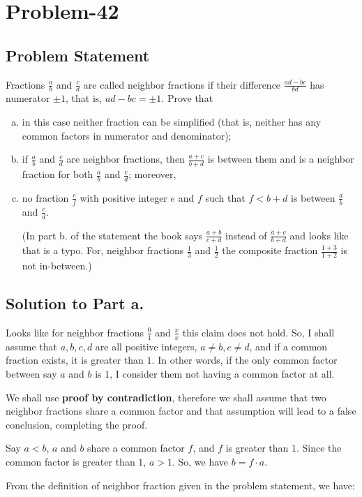 \documentclass{article}
\begin{document}
\section*{Problem-42}

\subsection*{Problem Statement}
Fractions $\frac{a}{b}$ and $\frac{c}{d}$ are called neighbor fractions if their difference $\frac{ad-bc}{bd}$ has numerator $\pm 1$, that is, $ad-bc = \pm 1$. Prove that 
\begin{enumerate}[a.]
\item in this case neither fraction can be simplified (that is, neither has any common factors in numerator and denominator);
\item if $\frac{a}{b}$ and $\frac{c}{d}$ are neighbor fractions, then $\frac{a+c}{b+d}$ is between them and is a neighbor fraction for both $\frac{a}{b}$ and $\frac{c}{d}$; moreover,
\item no fraction $\frac{e}{f}$ with positive integer $e$ and $f$ such that $f < b+d$ is between $\frac{a}{b}$ and $\frac{c}{d}$.

(In part b. of the statement the book says $\frac{a+b}{c+d}$ instead of $\frac{a+c}{b+d}$ and looks like that is a typo. For, neighbor fractions $\frac{1}{3}$ and $\frac{1}{2}$ the composite fraction $\frac{1+3}{1+2}$ is not in-between.)
\end{enumerate}
\subsection*{Solution to Part a.}
Looks like for neighbor fractions $\frac{0}{1}$ and $\frac{x}{x}$ this claim does not hold. So, I shall assume that $a, b, c, d$ are all positive integers, $a \neq b, c \neq d$, and if a common fraction exists, it is greater than $1$. In other words, if the only common factor between say $a$ and $b$ is $1$, I consider them not having a common factor at all.

We shall use \textbf{proof by contradiction}, therefore we shall assume that two neighbor fractions share a common factor and that assumption will lead to a false conclusion, completing the proof. 

Say $a < b$, $a$ and $b$ share a common factor $f$, and $f$ is greater than $1$. Since the common factor is greater than $1$, $a > 1$. So, we have $b = f\cdot a$.

From the definition of neighbor fraction given in the problem statement, we have:
\end{document}

